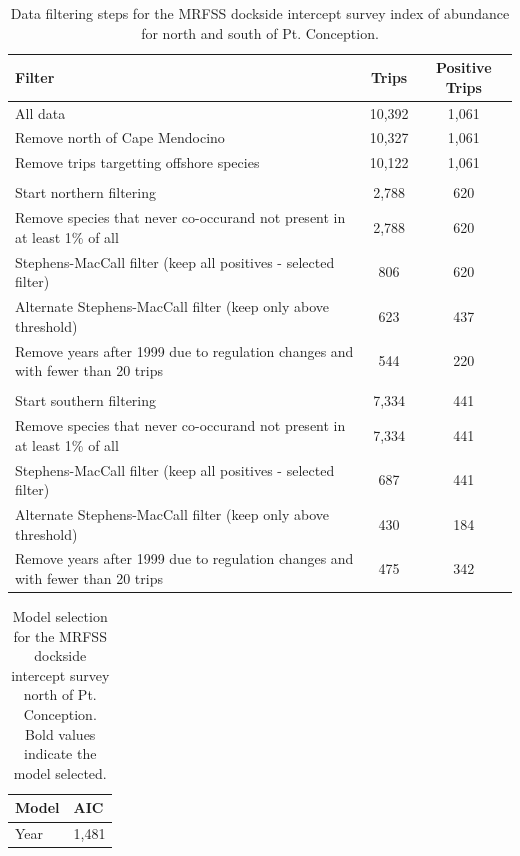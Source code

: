 \documentclass[12pt,]{article}
\begin{document}
\begin{table}[ht]
\centering
\caption{Data filtering steps for the MRFSS dockside intercept survey 
                                           index of abundance for north and south of Pt. Conception.} 
\label{tab:Fleet10_11_Filter}
\begin{tabular}{>{\centering}p{4in}cc}
  \hline
Filter & Trips & Positive Trips \\ 
  \hline
All data & 10,392 & 1,061 \\ 
  Remove north of Cape Mendocino & 10,327 & 1,061 \\ 
  Remove trips targetting offshore species & 10,122 & 1,061 \\ 
   &  &  \\ 
  Start northern filtering & 2,788 & 620 \\ 
  Remove species that never co-occurand  not present in at least 1\% of all & 2,788 & 620 \\ 
  Stephens-MacCall filter (keep all positives - selected filter) & 806 & 620 \\ 
  Alternate Stephens-MacCall filter (keep only above threshold) & 623 & 437 \\ 
  Remove years after 1999 due to regulation changes and with fewer than 20 trips & 544 & 220 \\ 
   &  &  \\ 
  Start southern filtering & 7,334 & 441 \\ 
  Remove species that never co-occurand  not present in at least 1\% of all & 7,334 & 441 \\ 
  Stephens-MacCall filter (keep all positives - selected filter) & 687 & 441 \\ 
  Alternate Stephens-MacCall filter (keep only above threshold) & 430 & 184 \\ 
  Remove years after 1999 due to regulation changes and with fewer than 20 trips & 475 & 342 \\ 
   \hline
\end{tabular}
\end{table}\begin{table}[ht]
\centering
\caption{Model selection for the MRFSS dockside intercept survey 
                                        north of Pt. Conception. Bold 
                                        values indicate the model selected.} 
\label{tab:Fleet10_AIC}
\begin{tabular}{ll}
  \hline
Model & AIC \\ 
  \hline
Year & 1,481 \\ 

\end{tabular}
\end{table}
\end{document}
